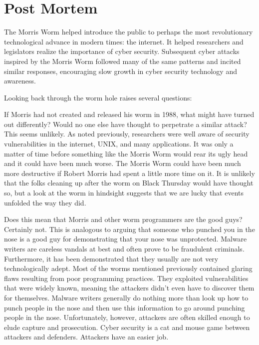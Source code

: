 \section*{Post Mortem}

The Morris Worm helped introduce the public to
perhaps the most revolutionary technological advance in modern times: the
internet. It helped researchers and legislators realize the importance of cyber
security. Subsequent cyber attacks inspired by the Morris Worm followed many of
the same patterns and incited similar responses, encouraging slow growth in
cyber security technology and awareness.

Looking back through the worm hole raises several questions: 

If Morris had not created and released his worm in 1988, what might have turned
out differently? Would no one else have thought to perpetrate a similar attack?
This seems unlikely. As noted previously, researchers were well aware of
security vulnerabilities in the internet, UNIX, and many applications. It was
only a matter of time before something like the Morris Worm would rear its ugly
head and it could have been much worse. The Morris
Worm could have been much more destructive if Robert Morris had spent a little
more time on it. It is unlikely that the folks cleaning up after the worm on
Black Thursday would have thought so, but a look at the worm in hindsight
suggests that we are lucky that events unfolded the way they did.

Does this mean that Morris and other worm programmers are the good guys?
Certainly not. This is analogous to arguing that someone who punched you in the
nose is a good guy for demonstrating that your nose was unprotected. Malware
writers are careless vandals at best and often prove to be fraudulent criminals.
Furthermore, it has been demonstrated that they usually are not very 
technologically adept. Most of the worms mentioned previously contained glaring
flaws resulting from poor programming practices. They exploited vulnerabilities
that were widely known, meaning the attackers didn't even have to discover them
for themselves. Malware writers generally do nothing more than look up how to
punch people in the nose and then use this information to go around punching
people in the nose.
Unfortunately, however, attackers are often skilled enough to elude capture and
prosecution.
Cyber security is a cat and mouse game between attackers and defenders.
Attackers have an easier job.

